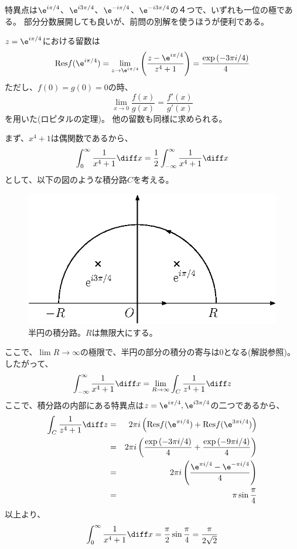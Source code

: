 特異点は$\e^{i \pi /4}$、$\e^{i 3\pi /4}$、$\e^{-i \pi /4}$、$\e^{-i 3\pi /4}$の４つで、いずれも一位の極である。
部分分数展開しても良いが、前問の別解を使うほうが便利である。

$z = \e^{i \pi /4}$における留数は
\begin{equation}
  \mbox{Res} f(\e^{i \pi /4}) = \lim_{z \rightarrow \e^{i \pi /4}} \left( \frac{z-\e^{i \pi /4}}{z^4+1} \right)
  = \frac{\exp{(-3\pi i/4})}{4}
\end{equation}
ただし、$f(0)=g(0)=0$の時、
\begin{equation}
  \lim_{x\rightarrow 0} \frac{f(x)}{g(x)} = \frac{f'(x)}{g'(x)}
\end{equation}
を用いた(ロピタルの定理)。
他の留数も同様に求められる。

まず、$x^4+1$は偶関数であるから、
\begin{equation}
  \int_0^{\infty} \frac{1}{x^4+1} \diff x = \frac{1}{2} \int_{-\infty}^{\infty}  \frac{1}{x^4+1} \diff x
\end{equation}
として、以下の図のような積分路$C$を考える。
\begin{figure}[htbp]
  \begin{center}
    \includegraphics[width=.5\linewidth]{fig/z_int2.eps}
  \end{center}
  \caption{
    半円の積分路。$R$は無限大にする。
  }
  \label{fig_z_int2}
\end{figure}
ここで、$\lim R \rightarrow \infty$の極限で、半円の部分の積分の寄与は$0$となる(解説参照)。
したがって、
\begin{equation}
  \int_{-\infty}^{\infty} \frac{1}{x^4+1} \diff x = \lim_{R \rightarrow \infty} \int_C \frac{1}{z^4+1} \diff z
\end{equation}
ここで、積分路の内部にある特異点は$z = \e^{i\pi/4},\e^{i3\pi/4}$の二つであるから、
\begin{eqnarray}
  \int_C \frac{1}{z^4+1} \diff z &=& 2 \pi i \left( \mbox{Res} f(\e^{\pi i/4}) +\mbox{Res} f(\e^{3\pi i/4})  \right)\\
  &=& 2 \pi i \left(  \frac{\exp{(-3\pi i /4})}{4} + \frac{\exp{(-9 \pi i /4})}{4}  \right)\\
  &=& 2 \pi i \left(  \frac{\e^{\pi i/4}-\e^{- \pi i/4}}{4}  \right)\\
  &=& \pi \sin \frac{\pi}{4}
\end{eqnarray}
以上より、
\begin{equation}
  \int_0^{\infty} \frac{1}{x^4+1} \diff x = \frac{\pi}{2} \sin \frac{\pi}{4} = \frac{\pi}{2\sqrt{2}}
\end{equation}

